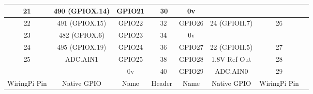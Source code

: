 \documentclass[11pt,a4paper]{article}
\begin{document}
\begin{sffamily}
\begin{center}
\begin{tabular}{|c|c|c||p{8mm}|p{8mm}||c|c|c|c|}
\hline
21	& 490 (GPIOX.14)	& \textcolor{rtb-green}{GPIO21}	& \raggedleft{29} & 30 & \textcolor{rtb-black}{0v}		&					& \\
\hline
22	& 491 (GPIOX.15)	& \textcolor{rtb-green}{GPIO22}	& \raggedleft{31} & 32 & \textcolor{rtb-green}{GPIO26}	& 24 (GPIOH.7)	& 26\\
\hline
23	& 482 (GPIOX.6)		& \textcolor{rtb-green}{GPIO23}	& \raggedleft{33} & 34 & \textcolor{rtb-black}{0v}		&					& \\
\hline
24	& 495 (GPIOX.19)		& \textcolor{rtb-green}{GPIO24}	& \raggedleft{35} & 36 & \textcolor{rtb-green}{GPIO27}	& 22 (GPIOH.5)		& 27\\
\hline
25	& ADC.AIN1			& \textcolor{rtb-green}{GPIO25}	& \raggedleft{37} & 38 & \textcolor{rtb-green}{GPIO28}	& 1.8V Ref Out		& 28\\
\hline
	& 					& \textcolor{rtb-black}{0v}		& \raggedleft{39} & 40 & \textcolor{rtb-green}{GPIO29}	& ADC.AIN0			& 29\\
\hline
\hline
WiringPi Pin	& Native GPIO	& Name	& \multicolumn{2}{|c||}{Header}	& Name	& Native GPIO	& WiringPi Pin\\
\hline
\end{tabular}
\end{center}

\end{sffamily}
\end{document}
